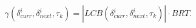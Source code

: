 %
%
%
\begin{equation}\label{eqn:crpd-formula}
    \gamma(\delta_{curr}^{i},\delta_{next}^{i},\tau_{k}) = | \textit{LCB}(\delta_{curr}^{i},\delta_{next}^{i},\tau_{k}) | \cdot BRT.
\end{equation}

